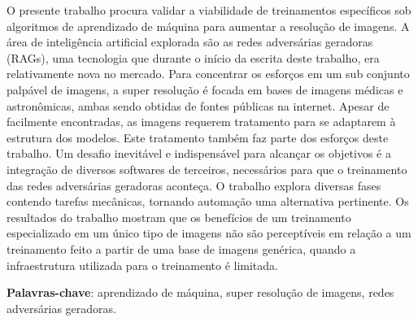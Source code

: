 \documentclass[
	11pt,
	openright,
	oneside,
	a4paper,
	english,
	french,
	spanish,
	brazil,	
	]{abntex2}
\begin{document}
\setlength{\absparsep}{18pt} 
\begin{resumo}

\noindent 

O presente trabalho procura validar a viabilidade de treinamentos específicos sob algoritmos de aprendizado de máquina para aumentar a resolução de imagens. A área de inteligência artificial explorada são as redes adversárias geradoras (RAGs), uma tecnologia que durante o início da escrita deste trabalho, era relativamente nova no mercado. Para concentrar os esforços em um sub conjunto palpável de imagens, a super resolução é focada em bases de imagens médicas e astronômicas, ambas sendo obtidas de fontes públicas na internet. Apesar de facilmente encontradas, as imagens requerem tratamento para se adaptarem à estrutura dos modelos. Este tratamento também faz parte dos esforços deste trabalho. Um desafio inevitável e indispensável para alcançar os objetivos é a integração de diversos softwares de terceiros, necessários para que o treinamento das redes adversárias geradoras aconteça. O trabalho explora diversas fases contendo tarefas mecânicas, tornando automação uma alternativa pertinente. Os resultados do trabalho mostram que os benefícios de um treinamento especializado em um único tipo de imagens não são perceptíveis em relação a um treinamento feito a partir de uma base de imagens genérica, quando a infraestrutura utilizada para o treinamento é limitada. 

\noindent 
\textbf{Palavras-chave}: aprendizado de máquina, super resolução de imagens, redes adversárias geradoras.

\end{resumo}
\end{document}
